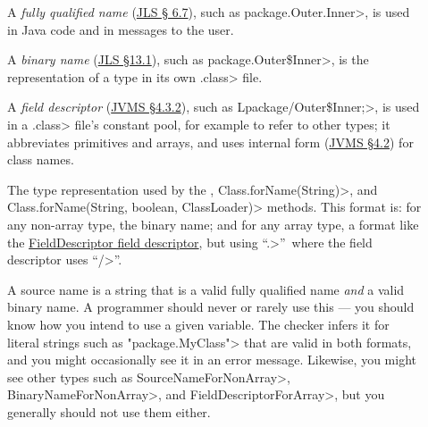 \begin{description}

\item[]
  A \emph{fully qualified name} (\href{https://docs.oracle.com/javase/specs/jls/se8/html/jls-6.html#jls-6.7}{JLS \S
    6.7}), such as
  \<package.Outer.Inner>, is used in Java code and in messages to
  the user.

\item[]
  A \emph{binary name} (\href{https://docs.oracle.com/javase/specs/jls/se8/html/jls-13.html#jls-13.1}{JLS \S 13.1}), such as
  \<package.Outer\$Inner>, is
  the representation of a type in its own \<.class> file.

\item[]
  A \emph{field descriptor} (\href{https://docs.oracle.com/javase/specs/jvms/se8/html/jvms-4.html#jvms-4.3.2}{JVMS \S 4.3.2}), such as
  \<Lpackage/Outer\$Inner;>, is used in a \<.class> file's constant pool,
  for example to refer to other types; it abbreviates primitives and
  arrays, and uses internal form (\href{https://docs.oracle.com/javase/specs/jvms/se8/html/jvms-4.html#jvms-4.2.1}{JVMS \S 4.2}) for class names.

\item[]
\begin{sloppypar}
  The type representation used by the
  , \<Class.forName(String)>,
  and \<Class.forName(String, boolean, ClassLoader)> methods.  This format
  is:  for any non-array type, the binary name; and for any array type, a
  format like the \href{https://docs.oracle.com/javase/specs/jvms/se8/html/jvms-4.html#jvms-4.3.2}{FieldDescriptor field descriptor}, but using
  ``\<.>''~where the field descriptor uses ``\</>''.
\end{sloppypar}

\item[]
  A source name is a string that is a valid fully qualified name \emph{and}
  a valid binary name.  A programmer should never or rarely use this --- you should
  know how you intend to use a given variable.  The checker infers it for
  literal strings such as \<"package.MyClass"> that are valid in both
  formats, and you might occasionally see it in an error message.
  Likewise, you might see other types such as \<SourceNameForNonArray>,
  \<BinaryNameForNonArray>, and \<FieldDescriptorForArray>, but you
  generally should not use them either.

\end{description}

